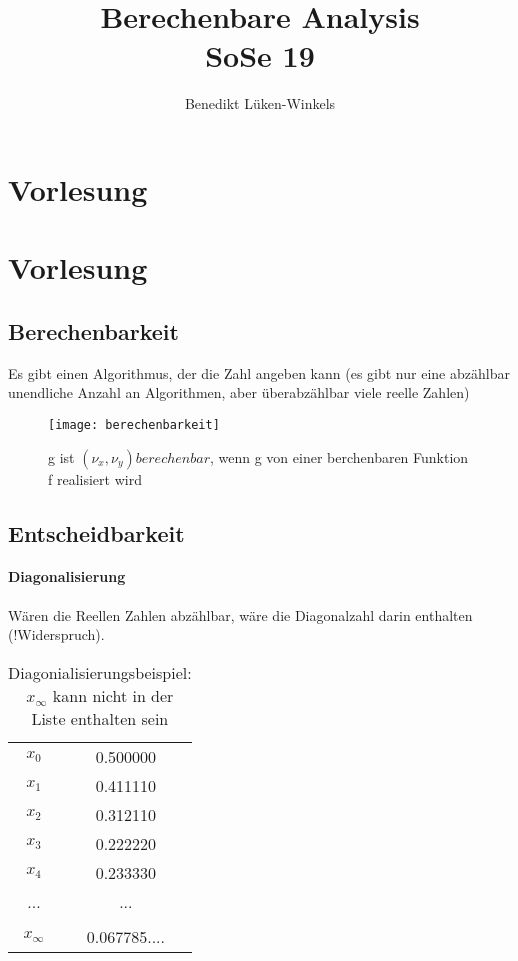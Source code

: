 \documentclass[ngerman]{scrartcl}
\title{Berechenbare Analysis \\ SoSe 19}
\author{Benedikt Lüken-Winkels}
\begin{document}
\maketitle
\tableofcontents
\newpage


\section{Vorlesung}
\section{Vorlesung}
\subsection{Berechenbarkeit}
Es gibt einen Algorithmus, der die Zahl angeben kann (es gibt nur eine abzählbar unendliche Anzahl an Algorithmen, aber überabzählbar viele reelle Zahlen)
\begin{figure}[h!]
  \centering
  \caption{ g ist $ (\nu_x, \nu_y) berechenbar $, wenn g von einer berchenbaren Funktion f realisiert wird}
  \texttt{[image: berechenbarkeit]}
\end{figure}
\subsection{Entscheidbarkeit}
\paragraph{Diagonalisierung} Wären die Reellen Zahlen abzählbar, wäre die Diagonalzahl darin enthalten (!Widerspruch).
\begin{table}[h!]
  \caption{Diagonialisierungsbeispiel: $ x_\infty $ kann nicht in der Liste enthalten sein}
  \label{tab:diagonal}
  \begin{center}
    \begin{tabular}{cc}
       $ x_0 $ & 0.500000 \\
       $ x_1 $ & 0.411110 \\
       $ x_2 $ & 0.312110 \\
       $ x_3 $ & 0.222220 \\
       $ x_4 $ & 0.233330 \\
       ... & ... \\
       \hline\\
       $ x_\infty $ & 0.067785....
    \end{tabular}
  \end{center}
\end{table}
\end{document}
